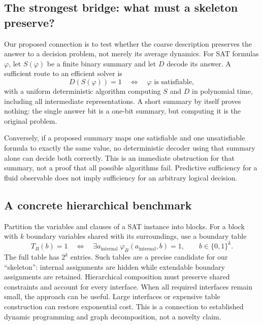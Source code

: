 \documentclass[11pt]{article}
\theoremstyle{definition}
\theoremstyle{plain}
\theoremstyle{remark}
\begin{document}
\subsection{The strongest bridge: what must a skeleton preserve?}

Our proposed connection is to test whether the coarse description preserves the answer to a decision problem, not merely its average dynamics. For SAT formulas $\varphi$, let $S(\varphi)$ be a finite binary summary and let $D$ decode its answer. A sufficient route to an efficient solver is
\begin{equation}
 D(S(\varphi))=1
 \quad\Longleftrightarrow\quad
 \varphi\text{ is satisfiable},
 \label{eq:sat-summary}
\end{equation}
with a uniform deterministic algorithm computing $S$ and $D$ in polynomial time, including all intermediate representations. A short summary by itself proves nothing: the single answer bit is a one-bit summary, but computing it is the original problem.

Conversely, if a proposed summary maps one satisfiable and one unsatisfiable formula to exactly the same value, no deterministic decoder using that summary alone can decide both correctly. This is an immediate obstruction for that summary, not a proof that all possible algorithms fail. Predictive sufficiency for a fluid observable does not imply sufficiency for an arbitrary logical decision.

\subsection{A concrete hierarchical benchmark}

Partition the variables and clauses of a SAT instance into blocks. For a block with $k$ boundary variables shared with its surroundings, use a boundary table
\begin{equation}
 T_B(b)=1\quad\Longleftrightarrow\quad
 \exists a_{\mathrm{internal}}\;\varphi_B(a_{\mathrm{internal}},b)=1,
 \qquad b\in\{0,1\}^k.
\end{equation}
The full table has $2^k$ entries. Such tables are a precise candidate for our ``skeleton'': internal assignments are hidden while extendable boundary assignments are retained. Hierarchical composition must preserve shared constraints and account for every interface. When all required interfaces remain small, the approach can be useful. Large interfaces or expensive table construction can restore exponential cost. This is a connection to established dynamic programming and graph decomposition, not a novelty claim.
\end{document}
